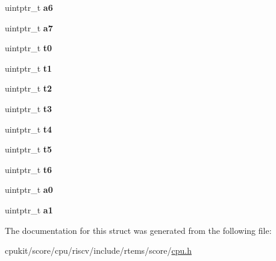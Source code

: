 \begin{DoxyCompactItemize}
uintptr\+\_\+t {\bfseries a6}
\item 
\mbox{\label{structRTEMS__ALIGNED_a37864ca714171016d29195db616a74e0}} 
uintptr\+\_\+t {\bfseries a7}
\item 
\mbox{\label{structRTEMS__ALIGNED_aa294adf647d749a9a2d80debb4888f79}} 
uintptr\+\_\+t {\bfseries t0}
\item 
\mbox{\label{structRTEMS__ALIGNED_a3158c5c94cc61cdea61806b2b668bc57}} 
uintptr\+\_\+t {\bfseries t1}
\item 
\mbox{\label{structRTEMS__ALIGNED_a9100160d43a0d713bb5a365e21749c34}} 
uintptr\+\_\+t {\bfseries t2}
\item 
\mbox{\label{structRTEMS__ALIGNED_a7c0459acdf2f2d20ab34fd050d1ffb80}} 
uintptr\+\_\+t {\bfseries t3}
\item 
\mbox{\label{structRTEMS__ALIGNED_a4397e728de41a3cc1a112f636d7ea9e7}} 
uintptr\+\_\+t {\bfseries t4}
\item 
\mbox{\label{structRTEMS__ALIGNED_ad8f8934a7fc99ac07e731bb59096bf01}} 
uintptr\+\_\+t {\bfseries t5}
\item 
\mbox{\label{structRTEMS__ALIGNED_acedc1c9d1e343c9fa1b48265828c9bfc}} 
uintptr\+\_\+t {\bfseries t6}
\item 
\mbox{\label{structRTEMS__ALIGNED_aaffa577b1947ce82f02825f8cc05ab9d}} 
uintptr\+\_\+t {\bfseries a0}
\item 
\mbox{\label{structRTEMS__ALIGNED_a9078ae29da0486ae3f289276774f9709}} 
uintptr\+\_\+t {\bfseries a1}
\end{DoxyCompactItemize}


The documentation for this struct was generated from the following file\+:\begin{DoxyCompactItemize}
\item 
cpukit/score/cpu/riscv/include/rtems/score/\mbox{\hyperlink{riscv_2include_2rtems_2score_2cpu_8h}{cpu.\+h}}\end{DoxyCompactItemize}
